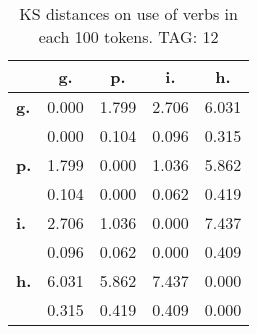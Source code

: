 \begin{table}[h!]
\begin{center}
\begin{tabular}{| l || c | c | c | c |}\hline
 & {\bf g.} & {\bf p.} & {\bf i.} & {\bf h.} \\\hline\hline
{\bf g.} & 0.000 & 1.799 & 2.706 & 6.031 \\
{\bf } & 0.000 & 0.104 & 0.096 & 0.315 \\\hline
{\bf p.} & 1.799 & 0.000 & 1.036 & 5.862 \\
{\bf } & 0.104 & 0.000 & 0.062 & 0.419 \\\hline
{\bf i.} & 2.706 & 1.036 & 0.000 & 7.437 \\
{\bf } & 0.096 & 0.062 & 0.000 & 0.409 \\\hline
{\bf h.} & 6.031 & 5.862 & 7.437 & 0.000 \\
{\bf } & 0.315 & 0.419 & 0.409 & 0.000 \\\hline
\end{tabular}
\caption{KS distances on use of verbs in each 100 tokens. TAG: 12}
\end{center}
\end{table}